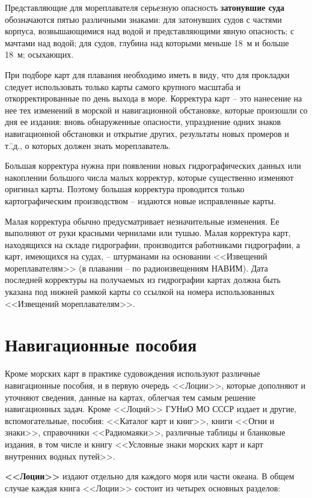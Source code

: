 \documentclass[a4paper, 12pt, twoside, final, book, russian, fittopage, cyremdash]{ncc}
\begin{document}
Представляющие для мореплавателя серьезную опасность \textbf{затонувшие суда} обозначаются пятью различными знаками: для затонувших судов с частями корпуса, возвышающимися над водой и представляющими явную опасность; с мачтами над водой; для судов, глубина над которыми меньше 18~м и больше 18~м; осыхающих. 

При подборе карт для плавания необходимо иметь в виду, что для прокладки следует использовать только карты самого крупного масштаба и откорректированные по день выхода в море. Корректура карт \--- это нанесение на нее тех изменений в морской и навигационной обстановке, которые произошли со дня ее издания: вновь обнаруженные опасности, упразднение одних знаков навигационной обстановки и открытие других, результаты новых промеров и т.\=,д., о которых должен знать мореплаватель. 

Большая корректура нужна при появлении новых гидрографических данных или накоплении большого числа малых корректур, которые существенно изменяют оригинал карты. Поэтому большая корректура проводится только картографическим производством \--- издаются новые исправленные карты. 

Малая корректура обычно предусматривает незначительные изменения. Ее выполняют от руки красными чернилами или тушью. Малая корректура карт, находящихся на складе гидрографии, производится работниками гидрографии, а карт, имеющихся на судах, \--- штурманами на основании <<Извещений мореплавателям>> (в плавании \--- по радиоизвещениям НАВИМ). Дата последней корректуры на получаемых из гидрографии картах должна быть указана под нижней рамкой карты со ссылкой на номера использованных <<Извещений мореплавателям>>. 

\section{Навигационные пособия}

Кроме морских карт в практике судовождения используют различные навигационные пособия, и в первую очередь <<Лоции>>, которые дополняют и уточняют сведения, данные на картах, облегчая тем самым решение навигационных задач. Кроме <<Лоций>> ГУНиО МО СССР издает и другие, вспомогательные, пособия: <<Каталог карт и книг>>, книги <<Огни и знаки>>, справочники <<Радиомаяки>>, различные таблицы и бланковые издания, в том числе и книгу <<Условные знаки морских карт и карт внутренних водных путей>>. 

\textbf{<<Лоции>>} издают отдельно для каждого моря или части океана. В общем случае каждая книга <<Лоции>> состоит из четырех основных разделов: 
\end{document}
